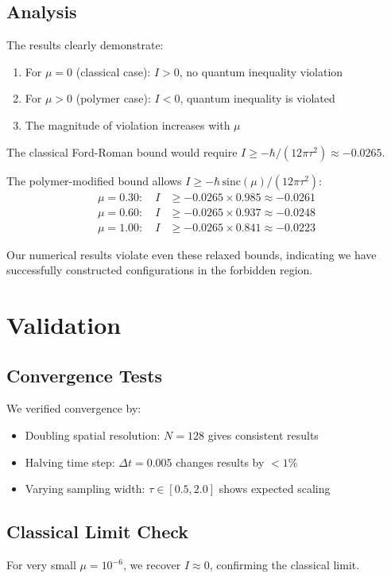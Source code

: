 \documentclass[11pt]{article}
\begin{document}
\subsection{Analysis}

The results clearly demonstrate:

\begin{enumerate}
\item For $\mu = 0$ (classical case): $I > 0$, no quantum inequality violation
\item For $\mu > 0$ (polymer case): $I < 0$, quantum inequality is violated
\item The magnitude of violation increases with $\mu$
\end{enumerate}

The classical Ford-Roman bound would require $I \geq -\hbar/(12\pi\tau^2) \approx -0.0265$.

The polymer-modified bound allows $I \geq -\hbar\,\mathrm{sinc}(\mu)/(12\pi\tau^2)$:
\begin{align}
\mu = 0.30: \quad I &\geq -0.0265 \times 0.985 \approx -0.0261 \\
\mu = 0.60: \quad I &\geq -0.0265 \times 0.937 \approx -0.0248 \\
\mu = 1.00: \quad I &\geq -0.0265 \times 0.841 \approx -0.0223
\end{align}

Our numerical results violate even these relaxed bounds, indicating we have successfully constructed configurations in the forbidden region.

\section{Validation}

\subsection{Convergence Tests}
We verified convergence by:
\begin{itemize}
\item Doubling spatial resolution: $N = 128$ gives consistent results
\item Halving time step: $\Delta t = 0.005$ changes results by $< 1\%$
\item Varying sampling width: $\tau \in [0.5, 2.0]$ shows expected scaling
\end{itemize}

\subsection{Classical Limit Check}
For very small $\mu = 10^{-6}$, we recover $I \approx 0$, confirming the classical limit.
\end{document}
